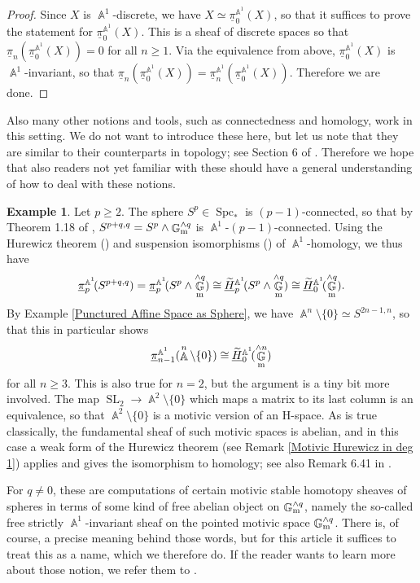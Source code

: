 \documentclass[english]{amsart}
\theoremstyle{definition}
\newtheorem{ex}[prop]{Example}
\DeclareMathOperator{\A}{\mathbb{A}}
\DeclareMathOperator{\G}{\mathbb{G}}
\DeclareMathOperator{\SL}{SL}
\DeclareMathOperator{\Spc}{Spc}
\begin{document}
\begin{proof}
Since $X$ is $\A^1$-discrete, we have $X \simeq \underline{\pi}^{\A^1}_0\!(X)$, so that it suffices to prove the statement for $\underline{\pi}^{\A^1}_0\!(X)$. This is a sheaf of discrete spaces so that $\underline{\pi}_n(\underline{\pi}^{\A^1}_0\!(X)) = 0$ for all $n \geq 1$. Via the equivalence from above, $\underline{\pi}^{\A^1}_0\!(X)$ is $\A^1$-invariant, so that $\underline{\pi}_n(\underline{\pi}^{\A^1}_0\!(X)) = \underline{\pi}_n^{\A^1}\!(\underline{\pi}^{\A^1}_0\!(X))$. Therefore we are done.
\end{proof}
Also many other notions and tools, such as connectedness and homology, work in this setting. We do not want to introduce these here, but let us note that they are similar to their counterparts in topology; see Section 6 of \cite{MR2934577}. Therefore we hope that also readers not yet familiar with these should have a general understanding of how to deal with these notions.
\begin{ex}\label{Homotopy Sheaf Example}
Let $p \geq 2$. The sphere $S^p \in \Spc_*$ is $(p-1)$-connected, so that by Theorem 1.18 of \cite{MR2934577}, $S^{p+q,q} = S^p \wedge \G_{\rm m}^{\wedge q}$ is $\A^1$-$(p-1)$-connected. Using the Hurewicz theorem (\cite[Theorem 6.37]{MR2934577}) and suspension isomorphisms (\cite[Remark 6.30]{MR2934577}) of $\A^1$-homology, we thus have
$$\underline{\pi}_p^{\A^1}\!(S^{p+q,q}) = \underline{\pi}_p^{\A^1}\!(S^p \wedge \G_{\rm m}^{\wedge q}) \cong \widetilde{\phantom{H}}\hspace{-9.5pt}\underline{H}_p^{\A^1}\!(S^p \wedge \G_{\rm m}^{\wedge q}) \cong \widetilde{\phantom{H}}\hspace{-9.5pt}\underline{H}_0^{\A^1}\!(\G_{\rm m}^{\wedge q}).$$
By Example \ref{Punctured Affine Space as Sphere}, we have $\A^n \setminus \lbrace 0 \rbrace \simeq S^{2n-1,n}$, so that this in particular shows
$$\underline{\pi}_{n-1}^{\A^1}(\A^n \setminus \lbrace 0 \rbrace) \cong \widetilde{\phantom{H}}\hspace{-9.5pt}\underline{H}_0^{\A^1}\!(\G_{\rm m}^{\wedge n})$$ 
for all $n \geq 3$. This is also true for $n =2$, but the argument is a tiny bit more involved. The map $\SL_2 \rightarrow \A^2 \setminus \lbrace 0 \rbrace$ which maps a matrix to its last column is an equivalence, so that $\A^2 \setminus \lbrace 0 \rbrace$ is a motivic version of an H-space. As is true classically, the fundamental sheaf of such motivic spaces is abelian, and in this case a weak form of the Hurewicz theorem (see Remark \ref{Motivic Hurewicz in deg 1}) applies and gives the isomorphism to homology; see also Remark 6.41 in \cite{MR2934577}. 

For $q \neq 0$, these are computations of certain motivic stable homotopy sheaves of spheres in terms of some kind of free abelian object on $\G_{\rm m}^{\wedge q}$, namely the so-called free strictly $\A^1$-invariant sheaf on the pointed motivic space $\G_{\rm m}^{\wedge q}$. There is, of course, a precise meaning behind those words, but for this article it suffices to treat this as a name, which we therefore do. If the reader wants to learn more about those notion, we refer them to \cite{TomWS}.
\end{ex}
\end{document}
